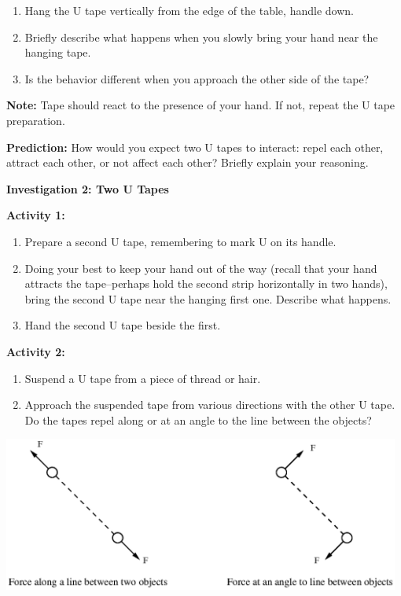 \begin{enumerate}
\item Hang the U tape vertically from the edge of the table, handle down.
\item Briefly describe what happens when you slowly bring your hand near
the hanging tape.\vspace{15mm}

\item Is the behavior different when you approach the other side of the
tape?\vspace{15mm}

\end{enumerate}
\textbf{Note:} Tape should react to the presence of your hand. If
not, repeat the U tape preparation.

\textbf{Prediction:} How would you expect two U tapes to interact:
repel each other, attract each other, or not affect each other? Briefly
explain your reasoning.
\vspace{1in}

\textbf{Investigation 2: Two U Tapes}

\textbf{Activity 1:}

\begin{enumerate}
\item Prepare a second U tape, remembering to mark U on its handle.
\item Doing your best to keep your hand out of the way (recall that your
hand attracts the tape--perhaps hold the second strip horizontally
in two hands), bring the second U tape near the hanging first one.
Describe what happens.\vspace{15mm}

\item Hand the second U tape beside the first.
\end{enumerate}
\textbf{Activity 2:}

\begin{enumerate}
\item Suspend a U tape from a piece of thread or hair.
\item Approach the suspended tape from various directions with the other
U tape. Do the tapes repel along or at an angle to the line between
the objects?
\end{enumerate}
\vspace{0.3cm}
\begin{center}
\includegraphics[width=0.98\textwidth]{interactions_of_electric_charges/int_elec_charges_fig_1.eps}
\end{center}
\vspace{0.3cm}

